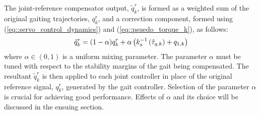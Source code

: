 The joint-reference compensator output, $\tilde{q}_{k}^{r}$, is formed as a weighted sum of the original gaiting trajectories, ${q}_{k}^{r}$, and a correction component, formed using (\ref{eq::servo_control_dynamics}) and (\ref{eq::psuedo_torque_k}), as follows:
	\vspace{-1.5mm}
	\begin{equation}
		\vspace{-1mm}
	 	\tilde{q}_{k}^{r} 	= (1-\alpha) {q}_{k}^{r} + \alpha \left( k_{s}^{-1}  \left(  \hat{\tau}_{q,k}  \right) +  {q}_{1,k} \right)
		\label{eq::correction_application}
	\end{equation}
where  $\alpha \in (0,1)$ is a uniform mixing parameter. The parameter $\alpha$ must be tuned with respect to the stability margins of the gait being compensated. The resultant $\tilde{q}_{k}^{r}$ is then applied  to each joint controller in place of the original reference signal,  ${q}_{k}^{r}$, generated by the gait controller. Selection of the parameter $\alpha$ is crucial for achieving good performance. Effects of $\alpha$ and its choice will be discussed in the ensuing section. 
